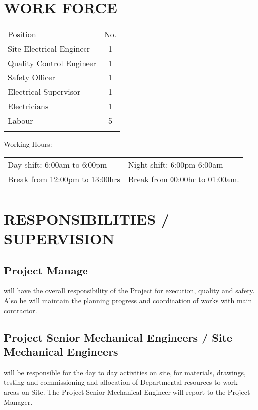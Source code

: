 \section{WORK FORCE}

\begin{center}
\begin{tabular}{|p{7.0cm}|c |}
\noalign{}\hline
Position	&No.\\
\noalign{}\hline
Site Electrical Engineer	&1\\
\noalign{}\hline
Quality Control Engineer	&1\\
\noalign{}\hline
Safety Officer	&1\\
\noalign{}\hline
Electrical Supervisor	&1\\
\noalign{}\hline
Electricians	&1\\
\noalign{}\hline
Labour	&5\\
\noalign{}\hline
\end{tabular}
\end{center}

Working Hours:

\begin{center}
\begin{tabular}{|l|l|}
\noalign{}\hline
Day shift: 6:00am to 6:00pm		&Night shift: 6:00pm 6:00am\\
\noalign{}\hline
Break from 12:00pm to 13:00hrs	&Break from 00:00hr to 01:00am.\\
\noalign{}\hline
\end{tabular}
\end{center}

\section{RESPONSIBILITIES / SUPERVISION}
	
\subsection{Project Manage}  will have the overall responsibility of the Project for execution, quality and safety. Also he will maintain the planning progress and coordination of works with main contractor.

\subsection{Project Senior Mechanical Engineers / Site Mechanical Engineers}  will be responsible for the day to day activities on site, for materials, drawings, testing and commissioning and allocation of Departmental resources to work areas on Site. The Project Senior Mechanical Engineer will report to the Project Manager.

